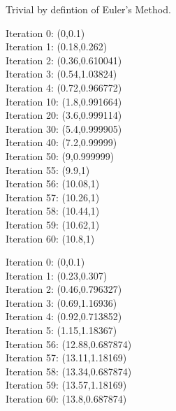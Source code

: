 \documentclass[11pt]{article}
\begin{document}
    \begin{solution}[Solution 2b]
        Trivial by defintion of Euler's Method.
    \end{solution}
    \begin{solution}[Answer 2c-i]
        Iteration 0: (0,0.1) \\
        Iteration 1: (0.18,0.262) \\
        Iteration 2: (0.36,0.610041)\\
        Iteration 3: (0.54,1.03824)\\
        Iteration 4: (0.72,0.966772)\\
        Iteration 10: (1.8,0.991664)\\
        Iteration 20: (3.6,0.999114)\\
        Iteration 30: (5.4,0.999905)\\
        Iteration 40: (7.2,0.99999)\\
        Iteration 50: (9,0.999999)\\
        Iteration 55: (9.9,1)\\
        Iteration 56: (10.08,1)\\
        Iteration 57: (10.26,1)\\
        Iteration 58: (10.44,1)\\
        Iteration 59: (10.62,1)\\
        Iteration 60: (10.8,1)
    \end{solution}
    \begin{solution}[Answer 2c-ii]
        Iteration 0: (0,0.1)\\
        Iteration 1: (0.23,0.307)\\
        Iteration 2: (0.46,0.796327)\\
        Iteration 3: (0.69,1.16936)\\
        Iteration 4: (0.92,0.713852)\\
        Iteration 5: (1.15,1.18367)\\
        Iteration 56: (12.88,0.687874)\\
        Iteration 57: (13.11,1.18169)\\
        Iteration 58: (13.34,0.687874)\\
        Iteration 59: (13.57,1.18169)\\
        Iteration 60: (13.8,0.687874)
    \end{solution}
    \newpage
\end{document}
